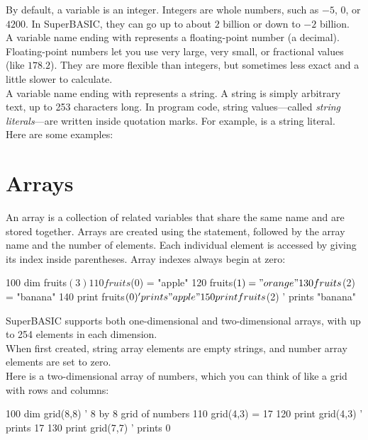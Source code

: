 By default, a variable is an integer. Integers are whole numbers, such as \(-5\), \(0\), or \(4200\).  In SuperBASIC, they can go up to about \(2\) billion or down to \(-2\) billion.\\

A variable name ending with \code{\#} represents a floating-point number (a decimal). Floating-point numbers let you use very large, very small, or fractional values (like \(178.2\)). They are more flexible than integers, but sometimes less exact and a little slower to calculate.\\

A variable name ending with \code{\$} represents a string. A string is simply arbitrary text, up to 253 characters long. In program code, string values—called \emph{string literals}—are written inside quotation marks. For example,  is a string literal.\\

Here are some examples:


\section{Arrays}

An array is a collection of related variables that share the same name and are stored together. Arrays are created using the  statement, followed by the array name and the number of elements. Each individual element is accessed by giving its index inside parentheses. Array indexes always begin at zero:

\begin{lst}
100 dim fruits$(3)
110 fruits$(0) = "apple"
120 fruits$(1) = "orange"
130 fruits$(2) = "banana"
140 print fruits$(0)  ' prints "apple"
150 print fruits$(2)  ' prints "banana"
\end{lst}

SuperBASIC supports both one-dimensional and two-dimensional arrays, with up to 254 elements in each dimension.\\

When first created, string array elements are empty strings, and number array elements are set to zero.\\ 

Here is a two-dimensional array of numbers, which you can think of like a grid with rows and columns:

\begin{lst}
100 dim grid(8,8)    ' 8 by 8 grid of numbers
110 grid(4,3) = 17
120 print grid(4,3)  ' prints 17
130 print grid(7,7)  ' prints 0
\end{lst}

